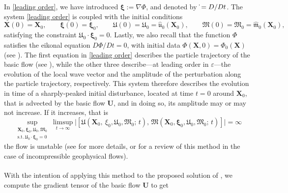 \documentclass[reqno]{amsart}
\newcommand{\uu}{\boldsymbol{\mathfrak{u}}}             %
\newcommand{\m}{\mathfrak{m}}
\newcommand{\A}{\boldsymbol{\mathfrak{U}}}              %
\newcommand{\B}{{\mathfrak{M}}}
\newcommand{\x}{\mathbf{X}}              %
\newcommand{\bu}{\mathbf{U}}             %
\newcommand{\e}{{\varepsilon}}
\begin{document}
In \eqref{leading order}, we have introduced $\boldsymbol{\xi}:=\nabla\Phi$, and denoted by $\dot{\empty}=D/{Dt}$. The system \eqref{leading order} is coupled with the initial conditions
\begin{equation}
    \x(0)=\x_0,\qquad \boldsymbol{\xi}(0)=\boldsymbol{\xi}_0, \qquad \A(0)=\A_0=\hat{\uu}_0(\x_0), \qquad \B(0)=\B_0={\hat{{\m}}_0(\x_0)},
\end{equation}
satisfying the constraint \(
    \A_0\cdot \boldsymbol{\xi}_0=0.\) Lastly, we also recall that the function $\Phi$ satisfies the eikonal equation $D\Phi/Dt=0$, with initial data $\Phi(\x,0)=\Phi_0(\x)$ (see \cite{LebovitzL}). The first equation in \eqref{leading order} describes the particle trajectory of the basic flow (see \cite{Bennett}), while the other three describe---at leading order in $\e$---the evolution of the local wave vector and the amplitude of the perturbation along the particle trajectory, respectively. This system therefore describes the evolution in time of a sharply-peaked initial disturbance, located at time $t=0$ around $ \x_0$, that is advected by the basic flow $ \bu$, and in doing so, its amplitude may or may not increase. If it increases, that is
    \begin{equation}
        \sup_{\substack{\x_0,\boldsymbol{\xi}_0, \A_0,\B_0\\ \text{s.t.}\ \A_0\cdot \boldsymbol{\xi}_0=0 }} \limsup_{t\rightarrow\infty}\bigl|\left[\A(\x_0,\boldsymbol\ {\xi}_0, \A_0,\B_0;\,t),\, \B(\x_0,\boldsymbol{\xi}_0, \A_0,\B_0;\,t)\right]\bigr|=\infty
    \end{equation}the flow is unstable (see \cite{LH,LebovitzL} for more details, or \cite{Kruse2} for a review of this method in the case of incompressible geophysical flows). \\
    \\
    With the intention of applying this method to the proposed solution of \cite{ConstantinMountain2023}, we compute the gradient tensor of the basic flow $\bu$ to get    
\end{document}
